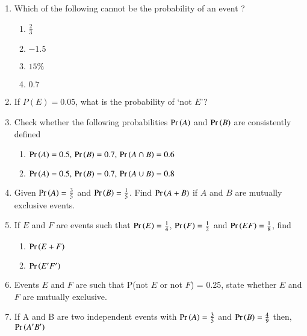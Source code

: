 \begin{enumerate}[label=\thesubsection.\arabic*,ref=\thesubsection.\theenumi]
	\item Which of the following cannot be the probability of an event ? 
	\vspace{-5mm}
\begin{multicols}{4}
\begin{enumerate}
\item $\frac{2}{3}$ 
\item $-1.5$ 
\item $15\%$ 
\item $0.7$ 
\end{enumerate}
\end{multicols}
	\vspace{-5mm}
\solution

\item If $P(E) = 0.05$, what is the probability of ‘not $E$’?\\
\solution

\item Check whether the following probabilities $\Pr\left(A\right)$ and $\Pr\left(B\right)$ are consistently defined
\begin{enumerate}
\item $\Pr\left(A\right) = 0.5,\, \Pr\left(B\right) = 0.7,\, \Pr\left(A \cap B\right) = 0.6$
\item $\Pr\left(A\right) = 0.5,\, \Pr\left(B\right) = 0.7,\, \Pr\left(A \cup B\right) = 0.8$
\end{enumerate}
\solution

\item Given $\Pr\left(A\right)=\frac{3}{5}$ and $\Pr\left(B\right)=\frac{1}{5}$. Find $\Pr\left(A+B\right)$ if $A$ and $B$ are mutually exclusive events.\\
\solution

\item If $E$ and $F$ are events such that $\Pr\left(E\right)=\frac{1}{4}$, $\Pr\left(F\right)= \frac{1}{2}$ and $\Pr\left(EF\right) =\frac{1}{8}$, find
\begin{enumerate}
\item $\Pr\left(E + F\right)$
\item $\Pr\left(E^\prime F^\prime\right)$
\end{enumerate}
\solution

\item Events $E$ and $F$ are such that P(not $E$ or not $F$) = 0.25, state whether $E$ and $F$ are mutually exclusive.\\
\solution

\item If A and B are two independent events with $\Pr\left(A\right)=\frac{3}{5}$ and $\Pr\left(B\right)=\frac{4}{9}$ then, $\Pr\left(A^\prime B^\prime\right)$

\end{enumerate}
